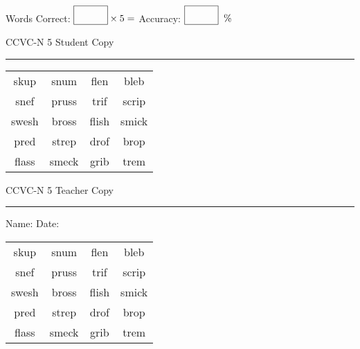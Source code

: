 \documentclass{memoir}
\begin{document}
\small

Words Correct: $\fbox{\phantom{\huge 100}} \times 5 = $ Accuracy: $\fbox{\phantom{\huge 100}}\;\; \%$ 

\vfill

\newpage


\footnotesize \noindent
CCVC-N 5 \hfill Student Copy
\smallskip
\hrule

\Large

\setlength{\tabcolsep}{14pt}
\def\arraystretch{3}

{\selectfont


\begin{vplace}[0.5]
\begin{center}
\begin{tabular}{cccc}
skup & snum & flen & bleb \\
snef & pruss       & trif & scrip \\
swesh & bross       & flish             & smick \\
pred & strep & drof & brop   \\
flass & smeck & grib                    & trem \\
\end{tabular}
\end{center}
\end{vplace}

}

\newpage

\footnotesize \noindent
CCVC-N 5 \hfill Teacher Copy
\smallskip
\hrule

\small

\vfill

\noindent
Name: \underline{\hspace{1.75in}} \hfill Date: \underline{\hspace{1in}}

\Large

{\selectfont


\begin{vplace}[0.5]
\begin{center}
\begin{tabular}{cccc}
skup & snum & flen & bleb \\
snef & pruss       & trif & scrip \\
swesh & bross       & flish             & smick \\
pred & strep & drof & brop   \\
flass & smeck & grib                    & trem \\
\end{tabular}
\end{center}
\end{vplace}



}
\end{document}
